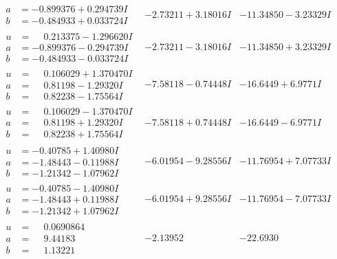 \documentclass[1p]{elsarticle_modified}
\theoremstyle{definition}
\begin{document}
$$\begin{array}{c|c|c}
\begin{aligned}
a &= -0.899376 + 0.294739 I \\
b &= -0.484933 + 0.033724 I\end{aligned}
 & -2.73211 + 3.18016 I & -11.34850 - 3.23329 I \\ \hline\begin{aligned}
u &= \phantom{-}0.213375 - 1.296620 I \\
a &= -0.899376 - 0.294739 I \\
b &= -0.484933 - 0.033724 I\end{aligned}
 & -2.73211 - 3.18016 I & -11.34850 + 3.23329 I \\ \hline\begin{aligned}
u &= \phantom{-}0.106029 + 1.370470 I \\
a &= \phantom{-}0.81198 - 1.29320 I \\
b &= \phantom{-}0.82238 - 1.75564 I\end{aligned}
 & -7.58118 - 0.74448 I & -16.6449 + 6.9771 I \\ \hline\begin{aligned}
u &= \phantom{-}0.106029 - 1.370470 I \\
a &= \phantom{-}0.81198 + 1.29320 I \\
b &= \phantom{-}0.82238 + 1.75564 I\end{aligned}
 & -7.58118 + 0.74448 I & -16.6449 - 6.9771 I \\ \hline\begin{aligned}
u &= -0.40785 + 1.40980 I \\
a &= -1.48443 - 0.11988 I \\
b &= -1.21342 - 1.07962 I\end{aligned}
 & -6.01954 - 9.28556 I & -11.76954 + 7.07733 I \\ \hline\begin{aligned}
u &= -0.40785 - 1.40980 I \\
a &= -1.48443 + 0.11988 I \\
b &= -1.21342 + 1.07962 I\end{aligned}
 & -6.01954 + 9.28556 I & -11.76954 - 7.07733 I \\ \hline\begin{aligned}
u &= \phantom{-}0.0690864\phantom{ +0.000000I} \\
a &= \phantom{-}9.44183\phantom{ +0.000000I} \\
b &= \phantom{-}1.13221\phantom{ +0.000000I}\end{aligned}
 & -2.13952\phantom{ +0.000000I} & -22.6930\phantom{ +0.000000I} \\ \hline\begin{aligned}

\end{aligned}
\end{array}$$
\end{document}
